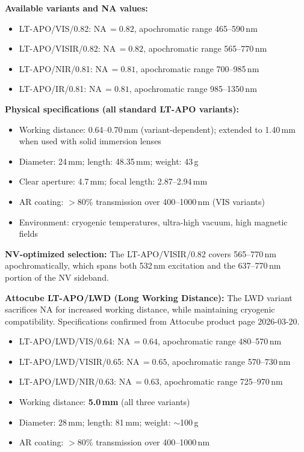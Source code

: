 \textbf{Available variants and NA values:}
\begin{itemize}
  \item LT-APO/VIS/0.82: NA\,$= 0.82$, apochromatic range 465--590\,nm
  \item LT-APO/VISIR/0.82: NA\,$= 0.82$, apochromatic range 565--770\,nm
  \item LT-APO/NIR/0.81: NA\,$= 0.81$, apochromatic range 700--985\,nm
  \item LT-APO/IR/0.81: NA\,$= 0.81$, apochromatic range 985--1350\,nm
\end{itemize}

\textbf{Physical specifications (all standard LT-APO variants):}
\begin{itemize}
  \item Working distance: 0.64--0.70\,mm (variant-dependent); extended
    to 1.40\,mm when used with solid immersion lenses \cite{AttocubeLTAPO_web}
  \item Diameter: 24\,mm; length: 48.35\,mm; weight: 43\,g \cite{AttocubeLTAPO_web}
  \item Clear aperture: 4.7\,mm; focal length: 2.87--2.94\,mm \cite{AttocubeLTAPO_web}
  \item AR coating: $> 80$\% transmission over 400--1000\,nm (VIS variants) \cite{AttocubeLTAPO_web}
  \item Environment: cryogenic temperatures, ultra-high vacuum, high
    magnetic fields \cite{AttocubeLTAPO_web}
\end{itemize}

\textbf{NV-optimized selection:} The LT-APO/VISIR/0.82 covers 565--770\,nm
apochromatically, which spans both 532\,nm excitation and the 637--770\,nm
portion of the NV sideband.

\textbf{Attocube LT-APO/LWD (Long Working Distance):}
The LWD variant sacrifices NA for increased working distance, while
maintaining cryogenic compatibility. Specifications confirmed from Attocube
product page 2026-03-20.\cite{AttocubeLTAPOLWD_web}

\begin{itemize}
  \item LT-APO/LWD/VIS/0.64: NA\,$= 0.64$, apochromatic range 480--570\,nm
  \item LT-APO/LWD/VISIR/0.65: NA\,$= 0.65$, apochromatic range 570--730\,nm
  \item LT-APO/LWD/NIR/0.63: NA\,$= 0.63$, apochromatic range 725--970\,nm
  \item Working distance: \textbf{5.0\,mm} (all three variants)
  \item Diameter: 28\,mm; length: 81\,mm; weight: $\sim$100\,g
  \item AR coating: $> 80$\% transmission over 400--1000\,nm \cite{AttocubeLTAPOLWD_web}
\end{itemize}

